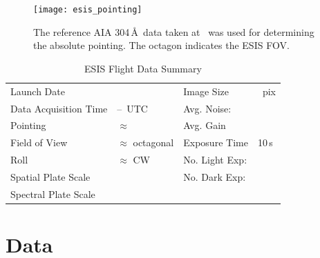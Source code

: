 		
		
		\begin{figure}[ht]
			\begin{center}
				\texttt{[image: esis\_pointing]}
				\caption{The reference AIA 304\,\AA\ data taken at \aianearapogee \ was used for determining the absolute pointing. The octagon indicates the ESIS FOV.}
				\label{fig:fov}
			\end{center}
		\end{figure}
	

		\begin{table}
		\begin{center}
			\caption{ESIS Flight Data Summary}
			\label{tab:data_info}
			\begin{tabular}{ll|ll}\hline
				Launch Date & \dateMission & Image Size  & \imageShape~pix\\
				Data Acquisition Time & \timeDataStart--\timeDataStop~UTC & Avg. Noise: & \readoutNoise\tablenotemark{a}\\ 
			    Pointing   &  $\approx$ \esispointing & Avg. Gain &   \gain \\
				Field of View  & $\approx$ \esisfov octagonal  & Exposure Time & 10\,s \\
				Roll & $\approx$ \esisroll CW & No. Light Exp: &\numDataFrames\\
			    Spatial  Plate Scale  &  \plateScale & No. Dark Exp: &\numDarkFrames \\
				Spectral  Plate Scale  &  \dispersion & \\
					\hline
			\end{tabular}
		\end{center}
		\end{table}
		
		



	
\section{Data} 

